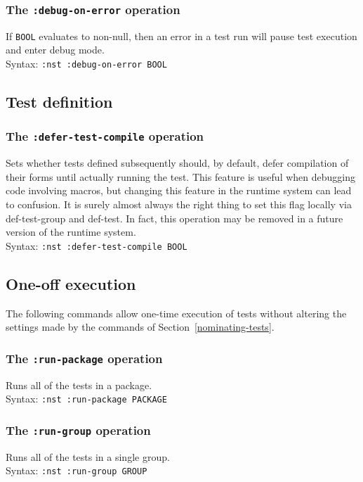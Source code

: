 \subsubsection{The \texttt{:debug-on-error} operation}
%
If \texttt{BOOL} evaluates to non-null, then an error in a test run
will pause test execution and enter debug mode.
\\ Syntax: \texttt{:nst :debug-on-error BOOL}

\subsection{Test definition}
\subsubsection{The \texttt{:defer-test-compile} operation}
%
Sets whether tests defined subsequently should, by default, defer
compilation of their forms until actually running the test.  This
feature is useful when debugging code involving macros, but changing
this feature in the runtime system can lead to confusion.  It is
surely almost always the right thing to set this flag locally via
def-test-group and def-test.  In fact, this operation may be removed
in a future version of the runtime system.
\\ Syntax: \texttt{:nst :defer-test-compile BOOL}

\subsection{One-off execution}
The following commands allow one-time execution of tests without
altering the settings made by the commands of
Section~\ref{nominating-tests}.

\subsubsection{The \texttt{:run-package} operation}
%
Runs all of the tests in a package.
\\ Syntax: \texttt{:nst :run-package PACKAGE}

\subsubsection{The \texttt{:run-group} operation}
%
Runs all of the tests in a single group.
\\ Syntax: \texttt{:nst :run-group GROUP}


